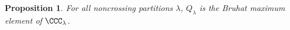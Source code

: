 \documentclass[submission]{FPSAC2024}
\newtheorem{prop}[equation]{Proposition}
\theoremstyle{definition}
\theoremstyle{remark}
\numberwithin{equation}{section}
\begin{document}
\begin{prop}
\label{prop:QSVinterval}
For all noncrossing partitions $\lambda$, $Q_{\lambda}$ is the Bruhat maximum element of $\CCC_{\lambda}$.  
\end{prop}

%
%
%
\end{document}

